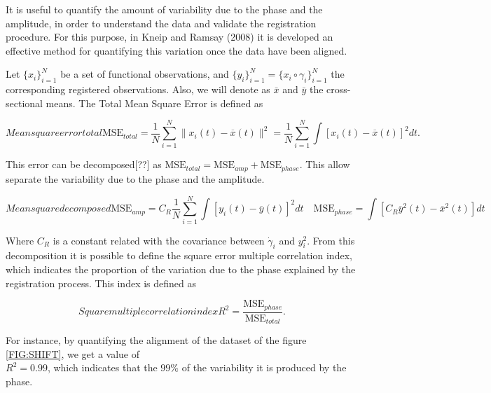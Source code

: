 It is useful to quantify the amount of variability due to the phase and the
amplitude, in order to understand the data and validate the registration
procedure. For this purpose, in Kneip and Ramsay (2008)
\cite{RamsayAlois2008} it is developed an effective method for quantifying
this variation once the data have been aligned.

Let $\{x_i\}_{i=1}^N$ be a set of functional observations, and
$\{y_i\}_{i=1}^N = \{x_i \circ \gamma_i\}_{i=1}^N$ the corresponding registered
observations. Also, we will denote as $\bar x$ and $\bar y$ the
cross-sectional means. The Total Mean Square Error is defined as

\begin{equation}[]{Mean square error total}
\text{MSE}_{total}=  \frac{1}{N}\sum_{i=1}^{N} \|x_i(t)-\overline x(t)\|^2 =
\frac{1}{N}\sum_{i=1}^{N}\int[x_i(t)-\overline x(t)]^2dt .
\end{equation}

This error can be decomposed[??] as
$\text{MSE}_{total} = \text{MSE}_{amp} + \text{MSE}_{phase}$. This allow separate
the variability due to the phase and the amplitude.

\begin{equation}[]{Mean square decomposed}
\text{MSE}_{amp} =  C_R \frac{1}{N}
        \sum_{i=1}^{N} \int \left [ y_i(t) - \overline{y}(t) \right ]^2 dt \quad
\text{MSE}_{phase}=
        \int \left [C_R \overline{y}^2(t) - \overline{x}^2(t) \right]dt
\end{equation}


Where $C_R$ is a constant related with the covariance between $\dot \gamma_i$
and $y_i^2$.
From this decomposition it is possible to define the
square error multiple correlation index, which indicates the proportion of the
variation due to the phase
explained by the registration process. This index is defined as

\begin{equation}[]{Square multiple correlation index}
R^2 = \frac{\text{MSE}_{phase}}{\text{MSE}_{total}}.
\end{equation}

For instance, by quantifying the alignment of the dataset of the figure
\ref{FIG:SHIFT}, we get a value of \\ $R^2=0.99$, which indicates that the $99\%$ of
the variability it is produced by the phase.
